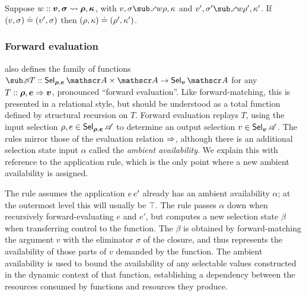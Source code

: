 \begin{lemma}
   Suppose $w :: \bm{v}, \bm{\sigma} \rightsquigarrow \bm{\rho}, \bm{\kappa}$, with $v, \sigma \matchFwdR{w} \rho, \kappa$ and $v', \sigma' \matchFwdR{w} \rho', \kappa'$. If $(v, \sigma) \doteq (v', \sigma)$ then $(\rho, \kappa) \doteq (\rho', \kappa')$.
\end{lemma}

\subsubsection{Forward evaluation}

 also defines the family of functions $\evalFwdF{T} :: \Sel{\raw{\rho}, \raw{e}}{A} \times \Ann{A} \to \Sel{\raw{v}}{A}$ for any $T :: \bm{\rho}, \bm{e} \Rightarrow \bm{v}$, pronounced ``forward evaluation''. Like forward-matching, this is presented in a relational style, but should be understood as a total function defined by structural recursion on $T$. Forward evaluation replays $T$, using the input selection $\rho, e \in \textup{\textsf{Sel}}_{\bm{\rho}, \bm{e}}\,{\mathscr{A}}$ to determine an output selection $v \in \textup{\textsf{Sel}}_{\bm{v}}\,{\mathscr{A}}$. The rules mirror those of the evaluation relation $\Rightarrow$, although there is an additional selection state input $\alpha$ called the \emph{ambient availability}. We explain this with reference to the application rule, which is the only point where a new ambient availability is assigned.

The rule assumes the application ${e}\,{e'}$ already has an ambient availability $\alpha$; at the outermost level this will usually be $\top$. The rule passes $\alpha$ down when recursively forward-evaluating $e$ and $e'$, but computes a new selection state $\beta$ when transferring control to the function. The $\beta$ is obtained by forward-matching the argument $v$ with the eliminator $\sigma$ of the closure, and thus represents the availability of those parts of $v$ demanded by the function. The ambient availability is used to bound the availability of any selectable values constructed in the dynamic context of that function, establishing a dependency between the resources consumed by functions and resources they produce.

